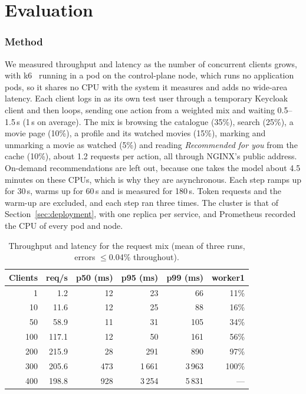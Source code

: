 \section{Evaluation}\label{sec:eval}

\subsubsection{Method} We measured throughput and latency as the number of concurrent clients grows, with k6~\cite{k6} running in a pod on the control-plane node, which runs no application pods, so it shares no CPU with the system it measures and adds no wide-area latency. Each client logs in as its own test user through a temporary Keycloak client and then loops, sending one action from a weighted mix and waiting 0.5--1.5\,s (1\,s on average). The mix is browsing the catalogue (35\%), search (25\%), a movie page (10\%), a profile and its watched movies (15\%), marking and unmarking a movie as watched (5\%) and reading \emph{Recommended for you} from the cache (10\%), about 1.2 requests per action, all through NGINX's public address. On-demand recommendations are left out, because one takes the model about 4.5 minutes on these CPUs, which is why they are asynchronous. Each step ramps up for 30\,s, warms up for 60\,s and is measured for 180\,s. Token requests and the warm-up are excluded, and each step ran three times. The cluster is that of Section~\ref{sec:deployment}, with one replica per service, and Prometheus recorded the CPU of every pod and node.

\begin{table}[t]\centering\footnotesize
\caption{Throughput and latency for the request mix (mean of three runs, errors $\le$0.04\% throughout).}\label{tab:eval}
\begin{tabular}{@{}rrrrrr@{}}
\toprule
\textbf{Clients} & \textbf{req/s} & \textbf{p50 (ms)} & \textbf{p95 (ms)} & \textbf{p99 (ms)} & \textbf{worker1}\\
\midrule
1   & 1.2   & 12   & 23    & 66    & 11\% \\
10  & 11.6  & 12   & 25    & 88    & 16\% \\
50  & 58.9  & 11   & 31    & 105   & 34\% \\
100 & 117.1 & 12   & 50    & 161   & 56\% \\
200 & 215.9 & 28   & 291   & 890   & 97\% \\
300 & 205.6 & 473  & 1\,661 & 3\,963 & 100\% \\
400 & 198.8 & 928  & 3\,254 & 5\,831 & --- \\
\bottomrule
\end{tabular}
\end{table}

